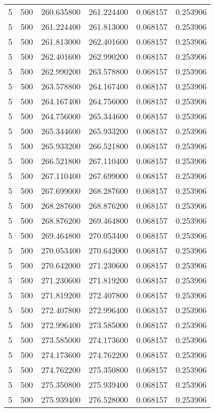 \begin{longtable}{rrrrrr}
5 & 500 & 260.635800 & 261.224400 & 0.068157 & 0.253906 \\
5 & 500 & 261.224400 & 261.813000 & 0.068157 & 0.253906 \\
5 & 500 & 261.813000 & 262.401600 & 0.068157 & 0.253906 \\
5 & 500 & 262.401600 & 262.990200 & 0.068157 & 0.253906 \\
5 & 500 & 262.990200 & 263.578800 & 0.068157 & 0.253906 \\
5 & 500 & 263.578800 & 264.167400 & 0.068157 & 0.253906 \\
5 & 500 & 264.167400 & 264.756000 & 0.068157 & 0.253906 \\
5 & 500 & 264.756000 & 265.344600 & 0.068157 & 0.253906 \\
5 & 500 & 265.344600 & 265.933200 & 0.068157 & 0.253906 \\
5 & 500 & 265.933200 & 266.521800 & 0.068157 & 0.253906 \\
5 & 500 & 266.521800 & 267.110400 & 0.068157 & 0.253906 \\
5 & 500 & 267.110400 & 267.699000 & 0.068157 & 0.253906 \\
5 & 500 & 267.699000 & 268.287600 & 0.068157 & 0.253906 \\
5 & 500 & 268.287600 & 268.876200 & 0.068157 & 0.253906 \\
5 & 500 & 268.876200 & 269.464800 & 0.068157 & 0.253906 \\
5 & 500 & 269.464800 & 270.053400 & 0.068157 & 0.253906 \\
5 & 500 & 270.053400 & 270.642000 & 0.068157 & 0.253906 \\
5 & 500 & 270.642000 & 271.230600 & 0.068157 & 0.253906 \\
5 & 500 & 271.230600 & 271.819200 & 0.068157 & 0.253906 \\
5 & 500 & 271.819200 & 272.407800 & 0.068157 & 0.253906 \\
5 & 500 & 272.407800 & 272.996400 & 0.068157 & 0.253906 \\
5 & 500 & 272.996400 & 273.585000 & 0.068157 & 0.253906 \\
5 & 500 & 273.585000 & 274.173600 & 0.068157 & 0.253906 \\
5 & 500 & 274.173600 & 274.762200 & 0.068157 & 0.253906 \\
5 & 500 & 274.762200 & 275.350800 & 0.068157 & 0.253906 \\
5 & 500 & 275.350800 & 275.939400 & 0.068157 & 0.253906 \\
5 & 500 & 275.939400 & 276.528000 & 0.068157 & 0.253906 \\

\end{longtable}
